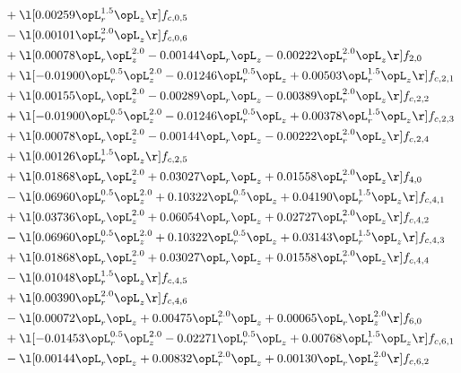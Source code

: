 \begin{alignat}{2}
& + \l[  0.00259 \opL_r^{1.5} \opL_z  \r] f_{c,0,5} \nonumber \\ 
& - \l[  0.00101 \opL_r^{2.0} \opL_z  \r] f_{c,0,6} \nonumber \\ 
& + \l[  0.00078 \opL_r \opL_z^{2.0}   -0.00144 \opL_r \opL_z   -0.00222 \opL_r^{2.0} \opL_z  \r] f_{2,0} \nonumber \\ 
& + \l[  -0.01900 \opL_r^{0.5} \opL_z^{2.0}   -0.01246 \opL_r^{0.5} \opL_z +  0.00503 \opL_r^{1.5} \opL_z  \r] f_{c,2,1} \nonumber \\ 
& + \l[  0.00155 \opL_r \opL_z^{2.0}   -0.00289 \opL_r \opL_z   -0.00389 \opL_r^{2.0} \opL_z  \r] f_{c,2,2} \nonumber \\ 
& + \l[  -0.01900 \opL_r^{0.5} \opL_z^{2.0}   -0.01246 \opL_r^{0.5} \opL_z +  0.00378 \opL_r^{1.5} \opL_z  \r] f_{c,2,3} \nonumber \\ 
& + \l[  0.00078 \opL_r \opL_z^{2.0}   -0.00144 \opL_r \opL_z   -0.00222 \opL_r^{2.0} \opL_z  \r] f_{c,2,4} \nonumber \\ 
& + \l[  0.00126 \opL_r^{1.5} \opL_z  \r] f_{c,2,5} \nonumber \\ 
& + \l[  0.01868 \opL_r \opL_z^{2.0} +  0.03027 \opL_r \opL_z +  0.01558 \opL_r^{2.0} \opL_z  \r] f_{4,0} \nonumber \\ 
& - \l[  0.06960 \opL_r^{0.5} \opL_z^{2.0} +  0.10322 \opL_r^{0.5} \opL_z +  0.04190 \opL_r^{1.5} \opL_z  \r] f_{c,4,1} \nonumber \\ 
& + \l[  0.03736 \opL_r \opL_z^{2.0} +  0.06054 \opL_r \opL_z +  0.02727 \opL_r^{2.0} \opL_z  \r] f_{c,4,2} \nonumber \\ 
& - \l[  0.06960 \opL_r^{0.5} \opL_z^{2.0} +  0.10322 \opL_r^{0.5} \opL_z +  0.03143 \opL_r^{1.5} \opL_z  \r] f_{c,4,3} \nonumber \\ 
& + \l[  0.01868 \opL_r \opL_z^{2.0} +  0.03027 \opL_r \opL_z +  0.01558 \opL_r^{2.0} \opL_z  \r] f_{c,4,4} \nonumber \\ 
& - \l[  0.01048 \opL_r^{1.5} \opL_z  \r] f_{c,4,5} \nonumber \\ 
& + \l[  0.00390 \opL_r^{2.0} \opL_z  \r] f_{c,4,6} \nonumber \\ 
& - \l[  0.00072 \opL_r \opL_z +  0.00475 \opL_r^{2.0} \opL_z +  0.00065 \opL_r \opL_z^{2.0}  \r] f_{6,0} \nonumber \\ 
& + \l[  -0.01453 \opL_r^{0.5} \opL_z^{2.0}   -0.02271 \opL_r^{0.5} \opL_z +  0.00768 \opL_r^{1.5} \opL_z  \r] f_{c,6,1} \nonumber \\ 
& - \l[  0.00144 \opL_r \opL_z +  0.00832 \opL_r^{2.0} \opL_z +  0.00130 \opL_r \opL_z^{2.0}  \r] f_{c,6,2} \nonumber \\ 

\end{alignat}
